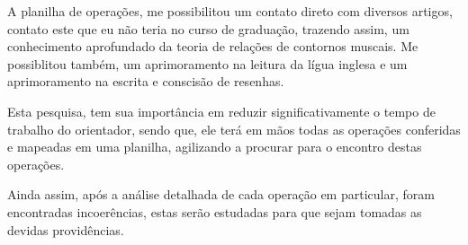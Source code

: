 \documentclass[11pt]{article}
\begin{document}
\label{sec:resultados}




A planilha de operações, me possibilitou um contato direto com
diversos artigos, contato este que eu não teria no curso de graduação,
trazendo assim, um conhecimento aprofundado da teoria de relações de
contornos muscais. Me possiblitou também, um aprimoramento na leitura
da lígua inglesa e um aprimoramento na escrita e conscisão de
resenhas.

\label{sec:discussao}


Esta pesquisa, tem sua importância em reduzir significativamente o
tempo de trabalho do orientador, sendo que, ele terá em mãos todas as
operações conferidas e mapeadas em uma planilha, agilizando a procurar
para o encontro destas operações.


Ainda assim, após a análise detalhada de cada operação em particular,
foram encontradas incoerências, estas serão estudadas para que sejam
tomadas as devidas providências.
\end{document}
